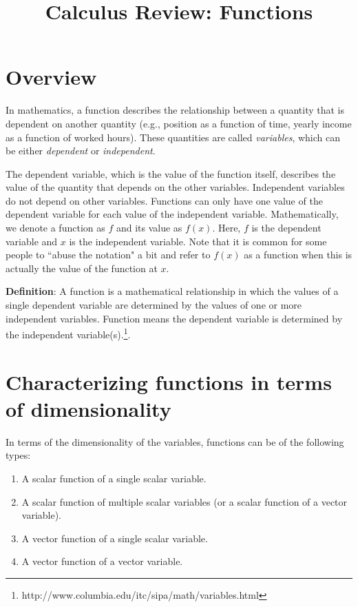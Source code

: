 \documentclass[12pt,letter]{article}
\title{{\bf Calculus Review: Functions} }
\date{}
\begin{document}
\maketitle
\vspace{-1.0in}



\section{Overview}
In mathematics, a function describes the relationship between a quantity that is dependent on another quantity (e.g., position as a function of time, yearly income as a function of worked hours). These quantities are called {\em variables}, which can be either {\em dependent} or {\em independent}. 

The dependent variable, which is the value of the function itself, describes the value of the quantity that depends on the other variables. Independent variables do not depend on other variables. Functions can only have one value of the dependent variable for each value of the independent variable. Mathematically, we denote a function as $f$ and its value as $f(x)$. Here, $f$ is the dependent variable and $x$ is the independent variable. Note that it is common for some people to ``abuse the notation" a bit and refer to $f(x)$ as a function when this is actually the value of the function at $x$. \\

    \begin{mdframed}[backgroundcolor=yellow!20] 
{\bf Definition}: A function is a mathematical relationship in which the values of a single dependent variable are determined by the values of one or more independent variables. Function means the dependent variable is determined by the independent variable(s).\footnote{http://www.columbia.edu/itc/sipa/math/variables.html}.
    \end{mdframed}



\section{Characterizing functions in terms of dimensionality}
In terms of the dimensionality of the variables, functions can be of the following types:

\begin{enumerate}
    \item A scalar function of a single scalar variable.
    \item A scalar function of multiple scalar variables (or a scalar function of a vector variable).
    \item A vector function of a single scalar variable.
    \item A vector function of a vector variable.
\end{enumerate}
\end{document}
